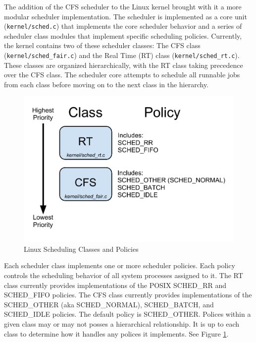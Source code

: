 \documentclass[12pt]{article}
\begin{document}
The addition of the CFS scheduler to the Linux kernel brought with it
a more modular scheduler implementation. The scheduler is implemented as
a core unit (\texttt{kernel/sched.c}) that implements the core
scheduler behavior and a series of scheduler class modules that
implement specific scheduling policies. Currently, the kernel contains
two of these scheduler classes: The CFS class
(\texttt{kernel/sched\_fair.c}) and the Real Time (RT) class
(\texttt{kernel/sched\_rt.c}). These classes are
organized hierarchically,
with the RT class taking precedence over the CFS class. The scheduler
core attempts to schedule all runnable jobs from each class before
moving on to the next class in the hierarchy.

\begin{figure}[htbp]
  \begin{center}
    \includegraphics[scale=.9]{LinuxSchedulingClass.pdf}
    \caption{Linux Scheduling Classes and Policies}
    \label{fig:LSClasses}
  \end{center}
\end{figure}

Each scheduler class implements one or more scheduler policies. Each
policy controls the scheduling behavior of all system processes
assigned to it. The RT class currently provides implementations of the
POSIX SCHED\_RR and SCHED\_FIFO policies. The CFS class currently
provides implementations of the SCHED\_OTHER (aka SCHED\_NORMAL),
SCHED\_BATCH, and SCHED\_IDLE policies. The default policy is
SCHED\_OTHER. Polices within a given class may or may not posses a
hierarchical relationship. It is up to each class to determine how it
handles any polices it implements. See Figure \ref{fig:LSClasses}. 
\end{document}
